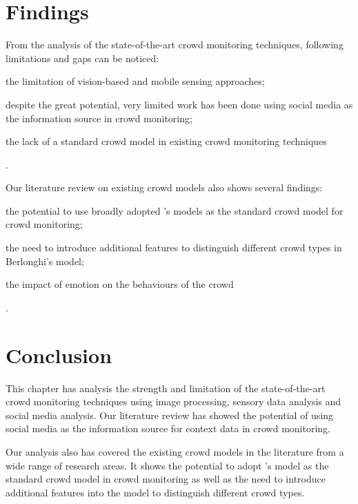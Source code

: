 \section{Findings}
From the analysis of the state-of-the-art crowd monitoring techniques, following limitations and gaps can be noticed:
\begin{inparaenum}[i)]
	\item the limitation of vision-based and mobile sensing approaches;
	\item despite the great potential, very limited work has been done using social media as the information source in crowd monitoring;
	\item the lack of a standard crowd model in existing crowd monitoring techniques
\end{inparaenum}.

Our literature review on existing crowd models also shows several findings:
\begin{inparaenum}[i)]
	\item the potential to use broadly adopted \citet{Berlonghi1995}'s models as the standard crowd model for crowd monitoring;
	\item the need to introduce additional features to distinguish different crowd types in Berlonghi's model;
	\item the impact of emotion on the behaviours of the crowd
\end{inparaenum}.

\section{Conclusion}
This chapter has analysis the strength and limitation of the state-of-the-art crowd monitoring techniques using image processing, sensory data analysis and social media analysis. Our literature review has showed the potential of using social media as the information source for context data in crowd monitoring.

Our analysis also has covered the existing crowd models in the literature from a wide range of research areas. It shows the potential to adopt \citet{Berlonghi1995}'s model as the standard crowd model in crowd monitoring as well as the need to introduce additional features into the model to distinguish different crowd types.